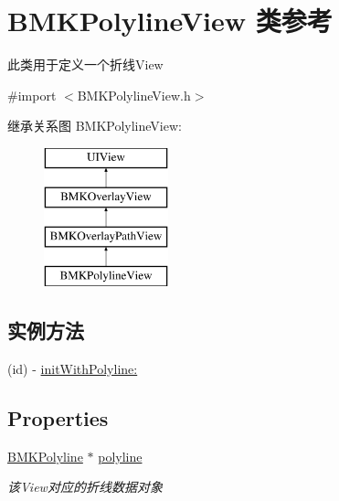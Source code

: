 \hypertarget{interface_b_m_k_polyline_view}{\section{B\-M\-K\-Polyline\-View 类参考}
\label{interface_b_m_k_polyline_view}
}


此类用于定义一个折线\-View  




{\ttfamily \#import $<$B\-M\-K\-Polyline\-View.\-h$>$}

继承关系图 B\-M\-K\-Polyline\-View\-:\begin{figure}[H]
\begin{center}
\leavevmode
\includegraphics[height=4.000000cm]{interface_b_m_k_polyline_view}
\end{center}
\end{figure}
\subsection*{实例方法}
\begin{DoxyCompactItemize}
\item 
(id) -\/ \hyperlink{interface_b_m_k_polyline_view_a9e771508504ccb0fdf491dcb406e23ed}{init\-With\-Polyline\-:}
\end{DoxyCompactItemize}
\subsection*{Properties}
\begin{DoxyCompactItemize}
\item 
\hypertarget{interface_b_m_k_polyline_view_a780ecfc589530cc4514e790422730e5f}{\hyperlink{interface_b_m_k_polyline}{B\-M\-K\-Polyline} $\ast$ \hyperlink{interface_b_m_k_polyline_view_a780ecfc589530cc4514e790422730e5f}{polyline}}\label{interface_b_m_k_polyline_view_a780ecfc589530cc4514e790422730e5f}

\begin{DoxyCompactList}\small\item\em 该\-View对应的折线数据对象 \end{DoxyCompactList}\end{DoxyCompactItemize}
